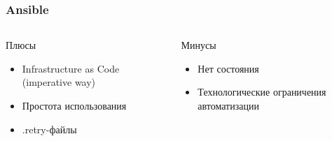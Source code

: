 \documentclass[mathserif,serif]{beamer}
\begin{document}
\begin{frame}
	\frametitle{Ansible}
	\begin{columns}[T]
		\begin{column}{.5\linewidth}
			\begin{minipage}[c][\textheight][c]{\linewidth}
          			Плюсы
				\begin{itemize}
					\item{Infrastructure as Code (imperative way)}
					\item{Простота использования}
					\item{.retry-файлы}
				\end{itemize}
			\end{minipage}
		\end{column}
		\begin{column}{.5\linewidth}
			\begin{minipage}[c][\textheight][c]{\linewidth}
          			Минусы
				\begin{itemize}
					\item{Нет состояния}
					\item{Технологические ограничения автоматизации}
				\end{itemize}
			\end{minipage}
		\end{column}
	\end{columns}
\end{frame}
\end{document}
